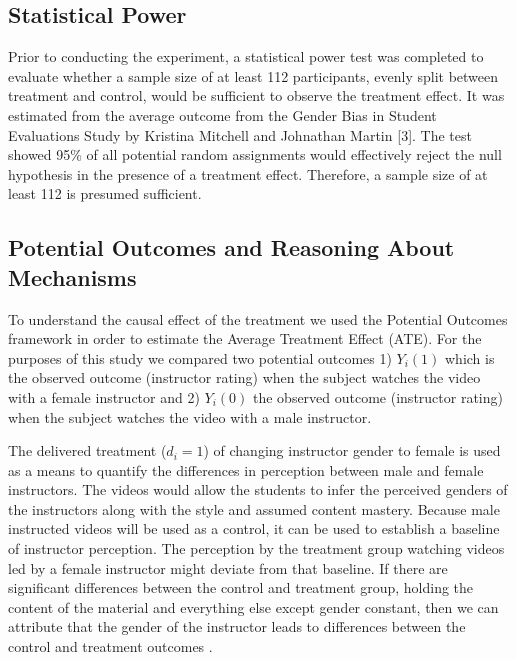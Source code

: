 \documentclass[
]{article}
\begin{document}
\hypertarget{statistical-power}{%
\subsection{Statistical Power}\label{statistical-power}}

Prior to conducting the experiment, a statistical power test was
completed to evaluate whether a sample size of at least 112
participants, evenly split between treatment and control, would be
sufficient to observe the treatment effect. It was estimated from the
average outcome from the Gender Bias in Student Evaluations Study by
Kristina Mitchell and Johnathan Martin {[}3{]}. The test showed 95\% of
all potential random assignments would effectively reject the null
hypothesis in the presence of a treatment effect. Therefore, a sample
size of at least 112 is presumed sufficient.

\hypertarget{potential-outcomes-and-reasoning-about-mechanisms}{%
\subsection{Potential Outcomes and Reasoning About
Mechanisms}\label{potential-outcomes-and-reasoning-about-mechanisms}}

To understand the causal effect of the treatment we used the Potential
Outcomes framework in order to estimate the Average Treatment Effect
(ATE). For the purposes of this study we compared two potential outcomes
1) \(Y_i(1)\) which is the observed outcome (instructor rating) when the
subject watches the video with a female instructor and 2) \(Y_i(0)\) the
observed outcome (instructor rating) when the subject watches the video
with a male instructor.

The delivered treatment (\(d_i=1\)) of changing instructor gender to
female is used as a means to quantify the differences in perception
between male and female instructors. The videos would allow the students
to infer the perceived genders of the instructors along with the style
and assumed content mastery. Because male instructed videos will be used
as a control, it can be used to establish a baseline of instructor
perception. The perception by the treatment group watching videos led by
a female instructor might deviate from that baseline. If there are
significant differences between the control and treatment group, holding
the content of the material and everything else except gender constant,
then we can attribute that the gender of the instructor leads to
differences between the control and treatment outcomes .
\end{document}
